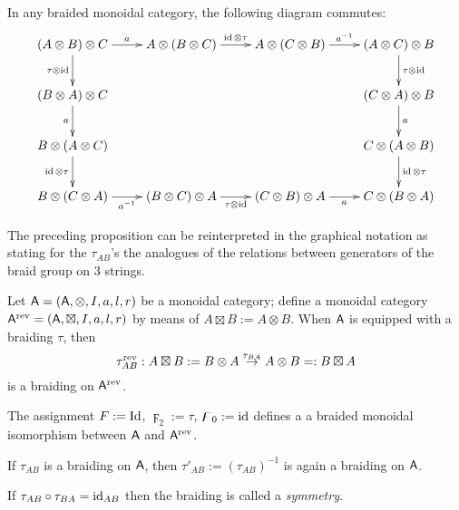 \begin{proposition}
  In any braided monoidal category, the following diagram commutes:
  \begin{equation*}
    \xymatrix{%
      (A\otimes B)\otimes C
      &
      A\otimes(B\otimes C)
      &
      A\otimes(C\otimes B)
      &
      (A\otimes C)\otimes B
      \\
      (B\otimes A)\otimes C
      &
      &
      &
      (C\otimes A)\otimes B
      \\
      B\otimes(A\otimes C)
      &
      &
      &
      C\otimes(A\otimes B)
      \\
      B\otimes(C\otimes A)
      &
      (B\otimes C)\otimes A
      &
      (C\otimes B)\otimes A
      &
      C\otimes(B\otimes A)
      \ar"1,1";"1,2" ^{a} 
      \ar"1,2";"1,3" ^{\id\otimes\tau}
      \ar"1,3";"1,4" ^{a\inv}
      \ar"1,1";"2,1" _{\tau\otimes\id}
      \ar"1,4";"2,4" ^{\tau\otimes\id}
      \ar"2,1";"3,1" _{a}
      \ar"2,4";"3,4" ^{a}
      \ar"3,1";"4,1" _{\id\otimes\tau}
      \ar"3,4";"4,4" ^{\id\otimes\tau}
      \ar"4,1";"4,2" _{a\inv}
      \ar"4,2";"4,3" _{\tau\otimes\id}
      \ar"4,3";"4,4" _{a}
      }
  \end{equation*}
\end{proposition}
The preceding proposition can be reinterpreted in the graphical
notation as stating for the $\tau_{AB}$'s the analogues of the relations
between generators of the braid group on $3$ strings.

Let $\mathsf{A} = (\mathsf{A}, \otimes, I, a, l, r)$ be a monoidal category; define a
monoidal category $\mathsf{A}\sp{\text{rev}} = (\mathsf{A}, \boxtimes, I, a, l, r)$ by means of
$A \boxtimes B := A\otimes B$.  When $\mathsf{A}$ is equipped with a braiding $\tau$,
then
\begin{equation*}
  \tau\sp{\text{rev}}_{AB}: A\boxtimes B := B\otimes A \stackrel{\tau_{BA}}\to A\otimes B =:
  B\boxtimes A
\end{equation*}
is a braiding on $\mathsf{A}\sp{\text{rev}}$.

\begin{proposition}
  \label{thm:rev}
  The assignment $F := \operatorname{Id}$, $\digamma_2 := \tau$, $\digamma_0 := \operatorname{id}$ defines a a
  braided monoidal isomorphism between $\mathsf{A}$ and $\mathsf{A}\sp{\text{rev}}$.
\end{proposition}

If $\tau_{AB}$ is a braiding on $\mathsf{A}$, then $\tau'_{AB} := (\tau_{AB})^{-1}$
is again a braiding on $\mathsf{A}$.
\begin{definition}
  If $\tau_{AB} \circ \tau_{BA} = \operatorname{id}_{AB}$ then the braiding is called a
  \emph{symmetry}.   
\end{definition}

